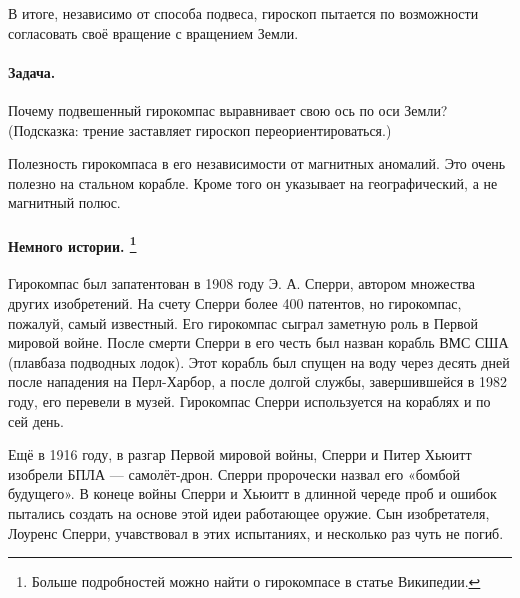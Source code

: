 В итоге, независимо от способа подвеса, гироскоп пытается по возможности согласовать своё вращение с вращением Земли.

\paragraph{Задача.} Почему подвешенный гирокомпас выравнивает свою ось по оси Земли?
(Подсказка: трение заставляет гироскоп переориентироваться.)

Полезность гирокомпаса в его независимости от магнитных аномалий.
Это очень полезно на стальном корабле.
Кроме того он указывает на географический, а не магнитный полюс.

\paragraph[Немного истории.]%
{Немного истории.%
\footnote{Больше подробностей можно найти о гирокомпасе в статье Википедии.}
}
Гирокомпас был запатентован в 1908 году Э. А. Сперри, автором множества других изобретений.
На счету Сперри более 400 патентов, но гирокомпас, пожалуй, самый известный.
Его гирокомпас сыграл заметную роль в Первой мировой войне.
После смерти Сперри в его честь был назван корабль ВМС США (плавбаза подводных лодок).
Этот корабль был спущен на воду через десять дней после нападения на Перл-Харбор, а после долгой службы, завершившейся в 1982 году, его перевели в музей.
Гирокомпас Сперри используется на кораблях и по сей день.

Ещё в 1916 году, в разгар Первой мировой войны,
Сперри и Питер Хьюитт изобрели БПЛА --- самолёт-дрон.
Сперри пророчески назвал его «бомбой будущего».
В конеце войны Сперри и Хьюитт в длинной череде проб и ошибок пытались создать на основе этой идеи работающее оружие.
Сын изобретателя, Лоуренс Сперри, учавствовал в этих испытаниях, и несколько раз чуть не погиб.
